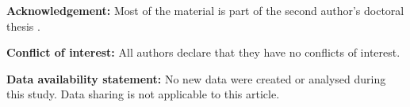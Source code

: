 \documentclass[11pt]{amsart}
\begin{document}
\noindent
{\bf Acknowledgement:} Most of the  material is part of the second author’s doctoral thesis \cite{ScaglioneThesis}.

\noindent
{\bf Conflict of interest:} All authors declare that they have no conflicts of interest.

\noindent
{\bf Data availability statement:} No new data were created or analysed during this study. Data sharing is not applicable to this article.


\nocite{*}

\end{document}
